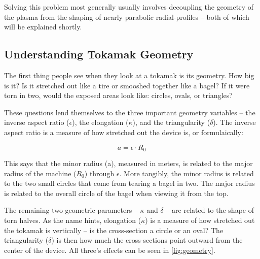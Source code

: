 Solving this problem most generally usually involves decoupling the geometry of the plasma from the shaping of nearly parabolic radial-profiles -- both of which will be explained shortly.

\subsection{Understanding Tokamak Geometry}

The first thing people see when they look at a tokamak is its geometry. How big is it? Is it stretched out like a tire or smooshed together like a bagel? If it were torn in two, would the exposed areas look like: circles, ovals, or triangles?

These questions lend themselves to the three important geometry variables -- the inverse aspect ratio ($\epsilon$), the elongation ($\kappa$), and the triangularity ($\delta$). The inverse aspect ratio is a measure of how stretched out the device is, or formulaically:

\begin{equation}
	\label{eq:a}
	a = \epsilon \cdot R_0
\end{equation}

This says that the minor radius (a), measured in meters, is related to the major radius of the machine ($R_0$) through $\epsilon$. More tangibly, the minor radius is related to the two small circles that come from tearing a bagel in two. The major radius is related to the overall circle of the bagel when viewing it from the top.

The remaining two geometric parameters -- $\kappa$ and $\delta$ -- are related to the shape of torn halves. As the name hints, elongation ($\kappa$) is a measure of how stretched out the tokamak is vertically -- is the cross-section a circle or an oval? The triangularity ($\delta$) is then how much the cross-sections point outward from the center of the device. All three's effects can be seen in \cref{fig:geometry}.

